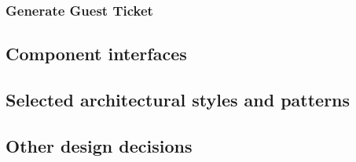 \subsubsection{Generate Guest Ticket}



\subsection{Component interfaces}

\subsection{Selected architectural styles and patterns}
\subsection{Other design decisions}

